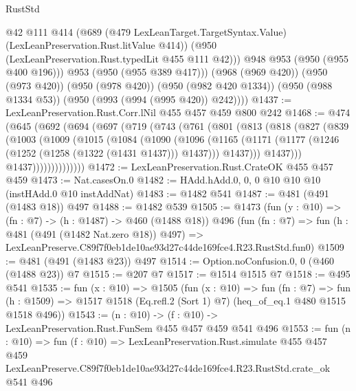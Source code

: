 \begin{lexlean}{RustStd}
\begin{coremodule}
              @42
              @111
              @414
              (@689
                (@479 LexLeanTarget.TargetSyntax.Value)
                (LexLeanPreservation.Rust.litValue @414))
              (@950 (LexLeanPreservation.Rust.typedLit @455 @111 @42)))
            @948
            @953
            (@950 (@955 @400 @196)))
          @953
          (@950 (@955 @389 @417)))
        (@968 (@969 @420))
        (@950 (@973 @420))
        (@950 (@978 @420))
        (@950 (@982 @420 @1334))
        (@950 (@988 @1334 @53))
        (@950 (@993 (@994 (@995 @420)) @242))))
@1437 := LexLeanPreservation.Rust.Corr.lNil @455 @457 @459 @800 @242
@1468 := @474
    (@645
      (@692
        (@694
          (@697
            (@719
              (@743
                (@761
                  (@801
                    (@813
                      (@818
                        (@827
                          (@839
                            (@1003
                              (@1009
                                (@1015
                                  (@1084
                                    (@1090
                                      (@1096
                                        (@1165
                                          (@1171
                                            (@1177
                                              (@1246 (@1252 (@1258 (@1322 (@1431 @1437))) @1437)))
                                            @1437)))
                                      @1437)))
                                @1437))))))))))))))
@1472 := LexLeanPreservation.Rust.CrateOK @455 @457 @459
@1473 := Nat.casesOn.{0}
@1482 := HAdd.hAdd.{0, 0, 0} @10 @10 @10 (instHAdd.{0} @10 instAddNat)
@1483 := @1482 @541
@1487 := @481 (@491 (@1483 @18)) @497
@1488 := @1482 @539
@1505 := @1473
    (fun (y : @10) => (fn : @7) -> (h : @1487) -> @460 (@1488 @18))
    @496
    (fun (fn : @7) =>
    fun (h : @481 (@491 (@1482 Nat.zero @18)) @497) =>
    LexLeanPreserve.C89f7f0eb1de10ae93d27c44de169fce4.R23.RustStd.fun0)
@1509 := @481 (@491 (@1483 @23)) @497
@1514 := Option.noConfusion.{0, 0} (@460 (@1488 @23)) @7
@1515 := @207 @7
@1517 := @1514 @1515 @7
@1518 := @495 @541
@1535 := fun (x : @10) =>
  @1505
    (fun (x : @10) =>
    fun (fn : @7) =>
    fun (h : @1509) => @1517 @1518 (Eq.refl.{2} (Sort 1) @7) (heq_of_eq.{1} @480 @1515 @1518 @496))
@1543 := (n : @10) -> (f : @10) -> LexLeanPreservation.Rust.FunSem @455 @457 @459 @541 @496
@1553 := fun (n : @10) =>
  fun (f : @10) =>
  LexLeanPreservation.Rust.simulate
    @455
    @457
    @459
    LexLeanPreserve.C89f7f0eb1de10ae93d27c44de169fce4.R23.RustStd.crate_ok
    @541
    @496
\end{coremodule}
\end{lexlean}
